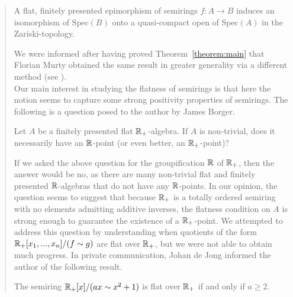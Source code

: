 \begin{abstract}
\begin{theorem}
A flat, finitely presented epimorphism of semirings $f: A \to B$ induces an isomorphism of $\text{Spec}(B)$ onto a quasi-compact open of $\text{Spec}(A)$ in the Zariski-topology.
\end{theorem}
We were informed after having proved Theorem~\ref{theorem:main} that Florian Murty obtained the same result in greater generality via
a different method (see \cite{Martyflat}).\\
\indent Our main interest in studying the flatness of semirings is that here the notion seems to capture some strong positivity properties of semirings. The following is 
a question posed to the author by James Borger.
\begin{question}
Let $A$ be a finitely presented flat $\bb{R}_{+}$-algebra. 
If $A$ is non-trivial, does it necessarily have an $\bb{R}$-point (or even better, an $\bb{R}_{+}$-point)?
\end{question}
If we asked the above question for the groupification $\bb{R}$ of $\bb{R}_{+}$, then the answer would be no, as there are many non-trivial flat and finitely presented $\bb{R}$-algebras that do not have any $\bb{R}$-points.
In our opinion, the question seems to suggest that because $\bb{R}_{+}$ is a totally ordered semiring with no elements admitting additive inverses, the flatness condition on $A$ is strong enough to guarantee the existence of a $\bb{R}_{+}$-point.
We attempted to address this question by understanding when quotients of the form $\bb{R}_{+}[x_1,...,x_n]/(f \sim g)$ are flat over $\bb{R}_{+}$, but we were not able to obtain 
much progress. In private communication, Johan de Jong informed the author of the following result.
\begin{theorem}[de Jong]
The semiring $\bb{R}_{+}[x]/(ax \sim x^2 + 1)$ is flat over $\bb{R}_{+}$ if and only if $a \ge 2$. 
\end{theorem}


\end{abstract}
